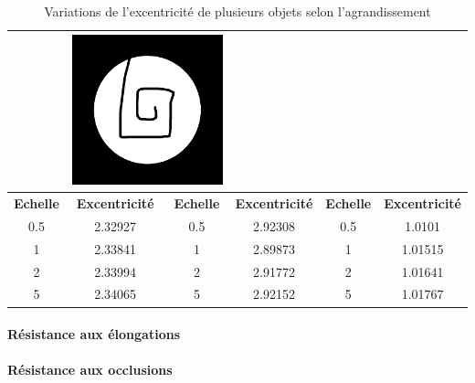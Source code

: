 \documentclass{article}
\begin{document}
\begin{table}
\begin{tabular}{|c|c|c|c|c|c|}
	    & \multicolumn{2}{|c|}{\includegraphics[scale=0.07]{Illustrations/device9-9.png}}  \\
	    \hline
	    \textbf{Echelle} & \textbf{Excentricité} & \textbf{Echelle} & \textbf{Excentricité} & \textbf{Echelle} & \textbf{Excentricité} \\
	    \hline
	    0.5 & 2.32927 & 0.5 & 2.92308 & 0.5 & 1.0101 \\
	    \hline
	    1 & 2.33841 & 1 & 2.89873 & 1 & 1.01515 \\
	    \hline
	    2 & 2.33994 & 2 & 2.91772 & 2 & 1.01641 \\
	    \hline
	    5 & 2.34065 & 5 & 2.92152 & 5 & 1.01767 \\
	    \hline
	  \end{tabular}
	  \caption{Variations de l'excentricité de plusieurs objets selon l'agrandissement}
	  \label{excentricité-scaling-table}
	  \end{table}  
	  
	\paragraph{Résistance aux élongations}
	
	\paragraph{Résistance aux occlusions}
	  
\end{document}
